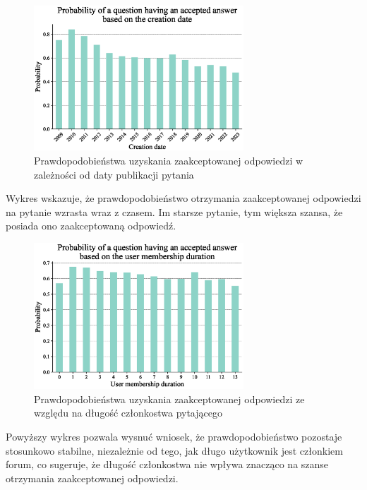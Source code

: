 \documentclass[12pt]{article}
\begin{document}
	\begin{figure}[H]
		\centering
		\includegraphics[width=0.7\textwidth]{question_creation_date}
		\caption{Prawdopodobieństwa uzyskania zaakceptowanej odpowiedzi w zależności od daty publikacji pytania}
		\label{fig:prawdopodobienstwa-uzyskania-odpowiedzi-data}
	\end{figure}
	Wykres wskazuje, że prawdopodobieństwo otrzymania zaakceptowanej odpowiedzi na pytanie wzrasta wraz z czasem. Im starsze pytanie, tym większa szansa, że posiada ono zaakceptowaną odpowiedź.
	
	\begin{figure}[H]
		\centering
		\includegraphics[width=0.7\textwidth]{user_experience}
		\caption{Prawdopodobieństwa uzyskania zaakceptowanej odpowiedzi ze względu na długość członkostwa pytającego}
		\label{fig:prawdopodobienstwa-uzyskania-odpowiedzi-czlonkostwo}
	\end{figure}
	Powyższy wykres pozwala wysnuć wniosek, że prawdopodobieństwo pozostaje stosunkowo stabilne, niezależnie od tego, jak długo użytkownik jest członkiem forum, co sugeruje, że długość członkostwa nie wpływa znacząco na szanse otrzymania zaakceptowanej odpowiedzi.
	
\end{document}

